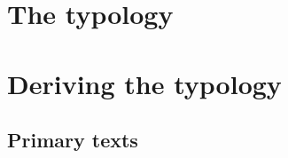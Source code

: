\documentclass[hidelinks,a4paper,oneside]{memoir}
\begin{document}
\part{The typology}\label{part:variation}



\part{Deriving the typology}\label{part:deriving}







\backmatter

\clearpage
\chapter*{Primary texts}
\begingroup
  \setlength{\LTleft}{-\tabcolsep}
\printacronyms[include=texts, heading=none]
\endgroup
{}

\newrefcontext[sorting=nyt]
\printbibliography

\end{document}
